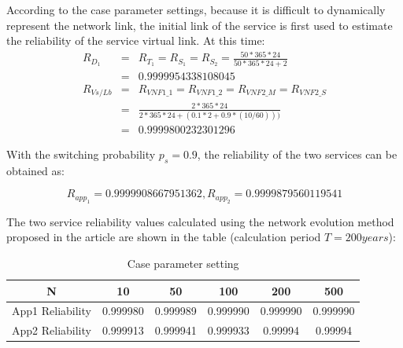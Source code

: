 \documentclass[journal]{IEEEtran}
\begin{document}
    According to the case parameter settings, because it is difficult to dynamically represent the network link, the initial link of the service is first used to estimate the reliability of the service virtual link. At this time:
    \begin{eqnarray}
        R_{D_1} &=& R_{T_1} = R_{S_1} = R_{S_2} = \frac{50*365*24}{50*365*24+2} \nonumber\\
                &=& 0.9999954338108045 \\
        R_{Vs/Lb} &=& R_{VNF1\_1} = R_{VNF1\_2} = R_{VNF2\_M} = R_{VNF2\_S}     \nonumber\\
                  &=& \frac{2*365*24}{2*365*24+(0.1*2+0.9*(10/60)))} \nonumber\\
                  &=& 0.9999800232301296
    \end{eqnarray}


    With the switching probability $p_s = 0.9$, the reliability of the two services can be obtained as:

    \begin{equation}
        R_{app_1} = 0.9999908667951362, R_{app_2} = 0.9999879560119541
    \end{equation}

    The two service reliability values calculated using the network evolution method proposed in the article are shown in the table (calculation period $T=200 years$):

    \begin{table}[!t]
        \renewcommand{\arraystretch}{1.3}
        \caption{Case parameter setting}
        \label{tab11}
        \centering
        \begin{tabular}{|c|c|c|c|c|c|}
            \hline
            N                & 10       & 50       & 100      & 200      & 500      \\
            \hline
            App1 Reliability & 0.999980 & 0.999989 & 0.999990 & 0.999990 & 0.999990 \\
            App2 Reliability & 0.999913 & 0.999941 & 0.999933 & 0.99994  & 0.99994  \\
            \hline
        \end{tabular}
    \end{table}
\end{document}
